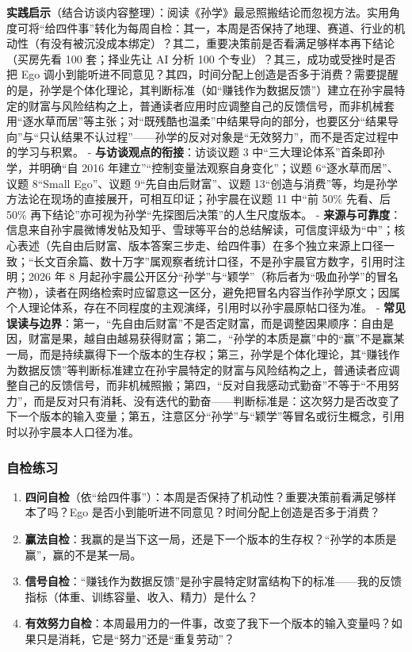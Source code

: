 \textbf{实践启示}（结合访谈内容整理）：阅读《孙学》最忌照搬结论而忽视方法。实用角度可将``给四件事''转化为每周自检：其一，本周是否保持了地理、赛道、行业的机动性（有没有被沉没成本绑定）？其二，重要决策前是否看满足够样本再下结论（买房先看
100 套；择业先让 AI 分析 100 个专业）？其三，成功或受挫时是否把 Ego
调小到能听进不同意见？其四，时间分配上创造是否多于消费？需要提醒的是，孙学是个体化理论，其判断标准（如``赚钱作为数据反馈''）建立在孙宇晨特定的财富与风险结构之上，普通读者应用时应调整自己的反馈信号，而非机械套用``逐水草而居''等主张；对``既残酷也温柔''中结果导向的部分，也要区分``结果导向''与``只认结果不认过程''------孙学的反对对象是``无效努力''，而不是否定过程中的学习与积累。
- \textbf{与访谈观点的衔接}：访谈议题 3
中``三大理论体系''首条即孙学，并明确``自 2016
年建立''``控制变量法观察自身变化''；议题 6``逐水草而居''、议题 8``Small
Ego''、议题 9``先自由后财富''、议题
13``创造与消费''等，均是孙学方法论在现场的直接展开，可相互印证；孙宇晨在议题
11 中``前 50\% 先看、后 50\%
再下结论''亦可视为孙学``先探图后决策''的人生尺度版本。 -
\textbf{来源与可靠度}：信息来自孙宇晨微博发帖及知乎、雪球等平台的总结解读，可信度评级为``中''；核心表述（先自由后财富、版本答案三步走、给四件事）在多个独立来源上口径一致；``长文百余篇、数十万字''属观察者统计口径，不是孙宇晨官方数字，引用时注明；2026
年 8
月起孙宇晨公开区分``孙学''与``颖学''（称后者为``吸血孙学''的冒名产物），读者在网络检索时应留意这一区分，避免把冒名内容当作孙学原文；因属个人理论体系，存在不同程度的主观演绎，引用时以孙宇晨原帖口径为准。
-
\textbf{常见误读与边界}：第一，``先自由后财富''不是否定财富，而是调整因果顺序：自由是因，财富是果，越自由越易获得财富；第二，``孙学的本质是赢''中的``赢''不是赢某一局，而是持续赢得下一个版本的生存权；第三，孙学是个体化理论，其``赚钱作为数据反馈''等判断标准建立在孙宇晨特定的财富与风险结构之上，普通读者应调整自己的反馈信号，而非机械照搬；第四，``反对自我感动式勤奋''不等于``不用努力''，而是反对只有消耗、没有迭代的勤奋------判断标准是：这次努力是否改变了下一个版本的输入变量；第五，注意区分``孙学''与``颖学''等冒名或衍生概念，引用时以孙宇晨本人口径为准。

\subsubsection{自检练习}

\begin{enumerate}
\def\labelenumi{\arabic{enumi}.}
\tightlist
\item
  \textbf{四问自检}（依``给四件事''）：本周是否保持了机动性？重要决策前看满足够样本了吗？Ego
  是否小到能听进不同意见？时间分配上创造是否多于消费？
\item
  \textbf{赢法自检}：我赢的是当下这一局，还是下一个版本的生存权？``孙学的本质是赢''，赢的不是某一局。
\item
  \textbf{信号自检}：``赚钱作为数据反馈''是孙宇晨特定财富结构下的标准------我的反馈指标（体重、训练容量、收入、精力）是什么？
\item
  \textbf{有效努力自检}：本周最用力的一件事，改变了我下一个版本的输入变量吗？如果只是消耗，它是``努力''还是``重复劳动''？
\end{enumerate}

